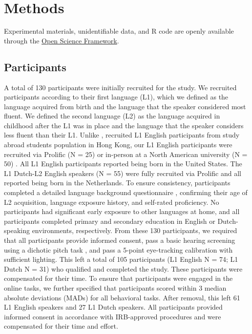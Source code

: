\section{Methods}
Experimental materials, unidentifiable data, and R code are openly available through the 
\href{https://osf.io/wa4gv/?view_only=de113dbced6b46fab96ca8217b3c1ca6}{Open Science Framework}.


\subsection{Participants}
A total of 130 participants were initially recruited for the study. We recruited participants according to their first language (L1), which we defined as the language acquired from birth and the language that the speaker considered most fluent. We defined the second language (L2) as the language acquired in childhood after the L1 was in place and the language that the speaker considers less fluent than their L1. Unlike \cite{ge2021a}, \which recruited L1 English participants from study abroad students population in Hong Kong, our L1 English participants were recruited via Prolific (N = 25) or in-person at a North American university (N = 50) \parencite{prolific2024}. All L1 English participants reported being born in the United States. The L1 Dutch-L2 English speakers (N = 55) were fully recruited via Prolific and all reported being born in the Netherlands. To ensure consistency, participants completed a detailed language background questionnaire \parencite{Marian_Blumenfeld_Kaushanskaya_2007}, confirming their age of L2 acquisition, language exposure history, and self-rated proficiency. No participants had significant early exposure to other languages at home, and all participants completed primary and secondary education in English or Dutch-speaking environments, respectively. From these 130 participants, we required that all participants provide informed consent, pass a basic hearing screening using a dichotic pitch task \parencite{milne_2021}, and pass a 5-point eye-tracking calibration with sufficient lighting. This left a total of 105 participants (L1 English N = 74; L1 Dutch N = 31) who qualified and completed the study. These participants were compensated for their time. To ensure that participants were engaged in the online tasks, we further specified that participants scored within 3 median absolute deviations (MADs) \parencite{Leys_2013} for all behavioral tasks. After removal, this left 61 L1 English speakers and 27 L1 Dutch speakers. All participants provided informed consent in accordance with IRB-approved procedures and were compensated for their time and effort.

